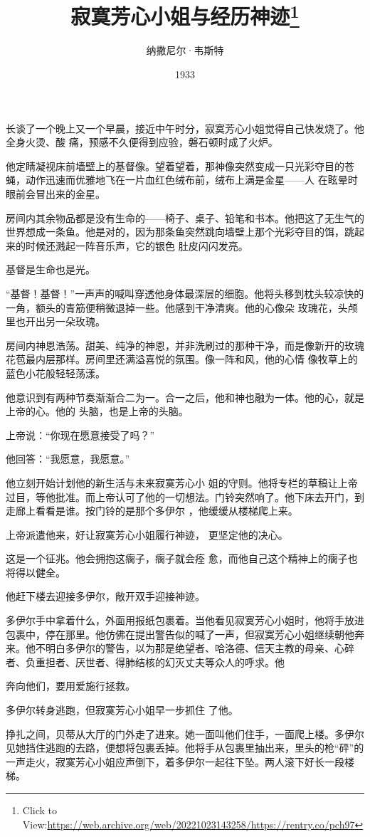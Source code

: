 \documentclass{article}
\title{寂寞芳心小姐与经历神迹\footnote{Click to View:\url{https://web.archive.org/web/20221023143258/https://rentry.co/pch97}}}
\author{纳撒尼尔·韦斯特}
\date{1933}
\begin{document}

\maketitle


\Large

﻿长谈了一个晚上又一个早晨，接近中午时分，寂寞芳心小姐觉得自己快发烧了。他全身火烫、酸
痛，预感不久便得到应验，磐石顿时成了火炉。 

他定睛凝视床前墙壁上的基督像。望着望着，那神像突然变成一只光彩夺目的苍蝇，动作迅速而优雅地飞在一片血红色绒布前，绒布上满是金星——人
在眩晕时眼前会冒出来的金星。 

房间内其余物品都是没有生命的——椅子、桌子、铅笔和书本。他把这了无生气的世界想成一条鱼。他是对的，因为那条鱼突然跳向墙壁上那个光彩夺目的饵，跳起来的时候还溅起一阵音乐声，它的银色
肚皮闪闪发亮。 

\newpage


基督是生命也是光。 

“基督！基督！”一声声的喊叫穿透他身体最深层的细胞。他将头移到枕头较凉快的一角，额头的青筋便稍微退掉一些。他感到干净清爽。他的心像朵
玫瑰花，头颅里也开出另一朵玫瑰。  

房间内神恩浩荡。甜美、纯净的神恩，并非洗刷过的那种干净，而是像新开的玫瑰花苞最内层那样。房间里还满溢喜悦的氛围。像一阵和风，他的心情
像牧草上的蓝色小花般轻轻荡漾。 

他意识到有两种节奏渐渐合二为一。合一之后，他和神也融为一体。他的心，就是上帝的心。他的
头脑，也是上帝的头脑。 


上帝说：“你现在愿意接受了吗？” 


他回答：“我愿意，我愿意。” 

他立刻开始计划他的新生活与未来寂寞芳心小
\newpage
姐的守则。他将专栏的草稿让上帝过目，等他批准。而上帝认可了他的一切想法。门铃突然响了。他下床去开门，到走廊上看看是谁。按门铃的是那个多伊尔
，他缓缓从楼梯爬上来。 

上帝派遣他来，好让寂寞芳心小姐履行神迹，
更坚定他的决心。 

这是一个征兆。他会拥抱这瘸子，瘸子就会痊
愈，而他自己这个精神上的瘸子也将得以健全。 

他赶下楼去迎接多伊尔，敞开双手迎接神迹。
 

多伊尔手中拿着什么，外面用报纸包裹着。当他看见寂寞芳心小姐时，他将手放进包裹中，停在那里。他仿佛在提出警告似的喊了一声，但寂寞芳心小姐继续朝他奔来。他不明白多伊尔的警告，以为那是绝望者、哈洛德、信天主教的母亲、心碎者、负重担者、厌世者、得肺结核的幻灭丈夫等众人的呼求。他

\newpage
奔向他们，要用爱施行拯救。 

多伊尔转身逃跑，但寂寞芳心小姐早一步抓住
了他。 

挣扎之间，贝蒂从大厅的门外走了进来。她一面叫他们住手，一面爬上楼。多伊尔见她挡住逃跑的去路，便想将包裹丢掉。他将手从包裹里抽出来，里头的枪“砰”的一声走火，寂寞芳心小姐应声倒下，着多伊尔一起往下坠。两人滚下好长一段楼梯。
\end{document}
